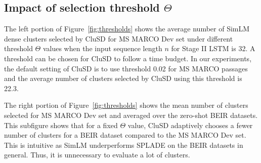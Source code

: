 \subsection{Impact of  selection threshold $\Theta$}
\label{sect:threshold}
The left portion of Figure~\ref{fig:thresholds} shows
the average number of SimLM dense clusters selected by CluSD for MS MARCO Dev set under different threshold $\Theta$ values  when
the input sequence length $n$ for Stage II LSTM is 32.
A threshold can be chosen for CluSD to follow a  time budget. 
In our experiments,  the default setting of
CluSD is to use threshold 0.02  for MS MARCO passages and the average number of clusters selected by CluSD using this threshold is 22.3.

The right portion of Figure~\ref{fig:thresholds} 
shows  the mean number of clusters selected for MS MARCO Dev set and averaged over 
the zero-shot BEIR datasets.
This subfigure shows that for a fixed $\Theta$ value, CluSD  adaptively chooses a fewer number of clusters for a
BEIR dataset compared to the MS MARCO Dev set.  
This is intuitive as
SimLM underperforms SPLADE on the BEIR datasets in general. Thus, it is unnecessary to evaluate a lot of clusters. 


